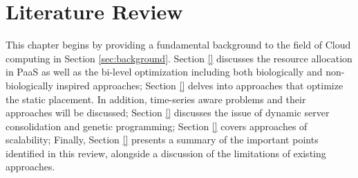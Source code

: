\chapter{Literature Review}\label{C:background}
This chapter begins by providing a fundamental background to the field of Cloud computing in Section \ref{sec:background}.
Section \ref{} discusses the resource allocation in PaaS as well as the bi-level optimization including both biologically and non-biologically
inspired approaches; Section \ref{} delves into approaches that optimize the static placement. In addition, time-series aware problems and their approaches will be discussed; Section \ref{} discusses the issue of dynamic server consolidation and genetic programming; Section \ref{} covers approaches of scalability; Finally, Section \ref{} presents a summary of the important points identified in this review, alongside a discussion of the limitations of existing approaches.



% 
% 
% 













